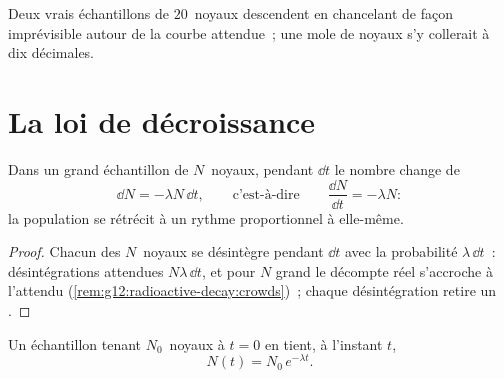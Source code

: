 \begin{omfigure}

{\small Deux vrais échantillons de $20$~noyaux descendent en
chancelant de façon imprévisible autour de la courbe attendue~; une
mole de noyaux s'y collerait à dix décimales.}
\end{omfigure}

\section{La loi de décroissance}

\begin{proposition}\label{prop:g12:radioactive-decay:ode}
Dans un grand échantillon de $N$~noyaux, pendant $\dd t$ le nombre
change de
\[
\dd N = -\lambda N\,\dd t, \qquad\text{c'est-à-dire}\qquad \frac{\dd N}{\dd t} = -\lambda N :
\]
la population se rétrécit à un rythme proportionnel à elle-même.
\end{proposition}

\begin{proof}
Chacun des $N$~noyaux se désintègre pendant $\dd t$ avec la
probabilité $\lambda\,\dd t$~: désintégrations attendues
$N\lambda\,\dd t$, et pour $N$ grand le décompte réel s'accroche à
l'attendu (\cref{rem:g12:radioactive-decay:crowds})~; chaque
désintégration retire un .
\end{proof}

\begin{theorem}\label{thm:g12:radioactive-decay:law}
Un échantillon tenant $N_0$~noyaux à $t = 0$ en tient, à l'instant
$t$,
\[
N(t) = N_0 \, e^{-\lambda t}.
\]
\end{theorem}

